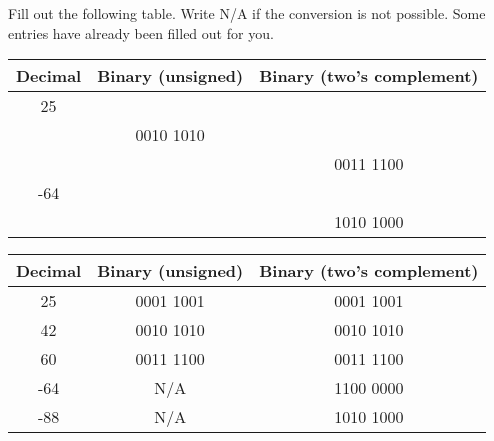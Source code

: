 \begin{blocksection}
    \question Fill out the following table. Write N/A if the conversion is not possible. Some entries have already been filled out for you.
    
    \begin{center}
      \begin{tabular}{|c|c|c|}
        \hline
        Decimal & Binary (unsigned) & Binary (two's complement) \\
        \hline\hline
        25 &  &  \\
        \hline
        & 0010 1010 & \\
        \hline
        &  & 0011 1100 \\
        \hline
        -64 &  &  \\
        \hline
        &  & 1010 1000 \\
        \hline
      \end{tabular}
    \end{center}
    
    \begin{solution}[2in]
    \begin{center}
      \begin{tabular}{|c|c|c|}
        \hline
        Decimal & Binary (unsigned) & Binary (two's complement) \\
        \hline\hline
        25 & 0001 1001 & 0001 1001 \\
        \hline
        42 & 0010 1010 & 0010 1010 \\
        \hline
        60 & 0011 1100 & 0011 1100 \\
        \hline
        -64 & N/A & 1100 0000 \\
        \hline
        -88 & N/A & 1010 1000 \\
        \hline
      \end{tabular}
    \end{center}
    \end{solution}
    \end{blocksection}